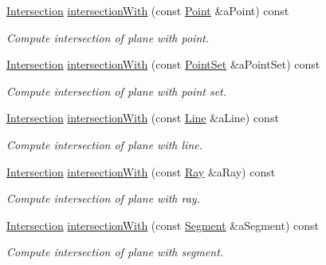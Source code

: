\begin{DoxyCompactItemize}
\hyperlink{classlibrary_1_1math_1_1geom_1_1d3_1_1_intersection}{Intersection} \hyperlink{classlibrary_1_1math_1_1geom_1_1d3_1_1objects_1_1_plane_ada9c15c3d9e0f8090fbe80d8d57232df}{intersection\+With} (const \hyperlink{classlibrary_1_1math_1_1geom_1_1d3_1_1objects_1_1_point}{Point} \&a\+Point) const
\begin{DoxyCompactList}\small\item\em Compute intersection of plane with point. \end{DoxyCompactList}\item 
\hyperlink{classlibrary_1_1math_1_1geom_1_1d3_1_1_intersection}{Intersection} \hyperlink{classlibrary_1_1math_1_1geom_1_1d3_1_1objects_1_1_plane_ad4c2d677fbae29b9a9261a3cd3bcbdba}{intersection\+With} (const \hyperlink{classlibrary_1_1math_1_1geom_1_1d3_1_1objects_1_1_point_set}{Point\+Set} \&a\+Point\+Set) const
\begin{DoxyCompactList}\small\item\em Compute intersection of plane with point set. \end{DoxyCompactList}\item 
\hyperlink{classlibrary_1_1math_1_1geom_1_1d3_1_1_intersection}{Intersection} \hyperlink{classlibrary_1_1math_1_1geom_1_1d3_1_1objects_1_1_plane_a4e6f9004893979945ea2e1c592eb5258}{intersection\+With} (const \hyperlink{classlibrary_1_1math_1_1geom_1_1d3_1_1objects_1_1_line}{Line} \&a\+Line) const
\begin{DoxyCompactList}\small\item\em Compute intersection of plane with line. \end{DoxyCompactList}\item 
\hyperlink{classlibrary_1_1math_1_1geom_1_1d3_1_1_intersection}{Intersection} \hyperlink{classlibrary_1_1math_1_1geom_1_1d3_1_1objects_1_1_plane_a421799a25ffd95169fd2db3d6d6c7f15}{intersection\+With} (const \hyperlink{classlibrary_1_1math_1_1geom_1_1d3_1_1objects_1_1_ray}{Ray} \&a\+Ray) const
\begin{DoxyCompactList}\small\item\em Compute intersection of plane with ray. \end{DoxyCompactList}\item 
\hyperlink{classlibrary_1_1math_1_1geom_1_1d3_1_1_intersection}{Intersection} \hyperlink{classlibrary_1_1math_1_1geom_1_1d3_1_1objects_1_1_plane_a5ba133ab41625da978af467f9f909dc5}{intersection\+With} (const \hyperlink{classlibrary_1_1math_1_1geom_1_1d3_1_1objects_1_1_segment}{Segment} \&a\+Segment) const
\begin{DoxyCompactList}\small\item\em Compute intersection of plane with segment. \end{DoxyCompactList}\item 

\end{DoxyCompactItemize}
